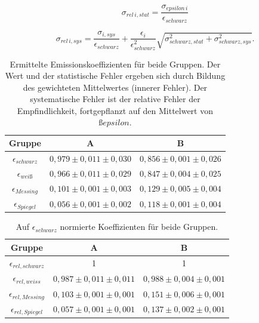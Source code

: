 \documentclass[12pt,a4paper]{article}
\begin{document}
\begin{equation}
\sigma_{rel \,i, stat} = \frac{\sigma_{epsilon \,i}}{\epsilon_{schwarz}}
\end{equation}

\begin{equation}
\sigma_{rel \,i, sys} = \frac{\sigma_{i,sys}}{\epsilon_{schwarz}} + \frac{\epsilon_{i}}{\epsilon_{schwarz}^2} \sqrt{\sigma_{schwarz, stat}^2 + \sigma_{schwarz, sys}^2}.
\end{equation}


\begin{table}
\centering
\begin{tabular}{|c|c|c|}
\hline
Gruppe & A & B \\
\hline
$\epsilon_{schwarz}$ & $ 0,979 \pm 0,011 \pm 0,030 $ & $ 0,856 \pm 0,001 \pm 0,026 $ \\
\hline
$\epsilon_{weiß}$ & $ 0,966 \pm 0,011 \pm 0,029 $ & $ 0,847 \pm 0,004 \pm 0,025 $ \\
\hline
$\epsilon_{Messing}$ & $ 0,101 \pm  0,001 \pm 0,003 $ & $ 0,129 \pm 0,005 \pm 0,004 $ \\
\hline
$\epsilon_{Spiegel}$ & $ 0,056 \pm 0,001 \pm 0,002 $ & $ 0,118 \pm 0,001 \pm 0,004 $ \\
\hline
\end{tabular}
\caption{Ermittelte Emissionskoeffizienten für beide Gruppen. Der Wert und der statistische Fehler ergeben sich durch Bildung des gewichteten Mittelwertes (innerer Fehler). Der systematische Fehler ist der relative Fehler der Empfindlichkeit, fortgepflanzt auf den Mittelwert von $ßepsilon$.}
\label{tab:Emission}
\end{table}

\begin{table}
\centering
\begin{tabular}{|c|c|c|}
\hline
Gruppe & A & B \\
\hline
$\epsilon_{rel,schwarz}$ & 1 & 1 \\
\hline
$\epsilon_{rel,weiss}$ & $ 0,987 \pm 0,011 \pm 0,011 $ & $ 0,988 \pm 0,004 \pm 0,001 $ \\
\hline
$\epsilon_{rel,Messing}$ & $ 0,103 \pm 0,001 \pm 0,001 $ & $ 0,151 \pm 0,006 \pm 0,001$ \\
\hline
$\epsilon_{rel,Spiegel}$ & $ 0,057 \pm 0,001 \pm 0,001 $ & $ 0,137 \pm 0,002 \pm 0,001$ \\
\hline
\end{tabular}
\caption{Auf $\epsilon_{schwarz}$ normierte Koeffizienten für beide Gruppen.}
\label{tab:Emission_relativ}
\end{table}
\end{document}
